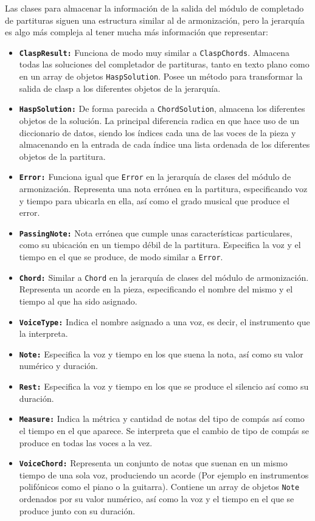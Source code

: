 Las clases para almacenar la información de la salida del módulo de completado de partituras siguen una estructura similar al de armonización, pero la jerarquía es algo más compleja al tener mucha más información que representar:
\begin{itemize}
	\item \texttt{\textbf{ClaspResult:}} Funciona de modo muy similar a \texttt{ClaspChords}. Almacena todas las soluciones del completador de partituras, tanto en texto plano como en un array de objetos \texttt{HaspSolution}. Posee un método para transformar la salida de clasp a los diferentes objetos de la jerarquía. 
	\item \texttt{\textbf{HaspSolution:}} De forma parecida a \texttt{ChordSolution}, almacena los diferentes objetos de la solución. La principal diferencia radica en que hace uso de un diccionario de datos, siendo los índices cada una de las voces de la pieza y almacenando en la entrada de cada índice una lista ordenada de los diferentes objetos de la partitura.
	\item \texttt{\textbf{Error:}} Funciona igual que \texttt{Error} en la jerarquía de clases del módulo de armonización. Representa una nota errónea en la partitura, especificando voz y tiempo para ubicarla en ella, así como el grado musical que produce el error.
	\item \texttt{\textbf{PassingNote:}} Nota errónea que cumple unas características particulares, como su ubicación en un tiempo débil de la partitura. Especifica la voz y el tiempo en el que se produce, de modo similar a \texttt{Error}.
	\item \texttt{\textbf{Chord:}} Similar a \texttt{Chord} en la jerarquía de clases del módulo de armonización. Representa un acorde en la pieza, especificando el nombre del mismo y el tiempo al que ha sido asignado.
	\item \texttt{\textbf{VoiceType:}} Indica el nombre asignado a una voz, es decir, el instrumento que la interpreta.
	\item \texttt{\textbf{Note:}} Especifica la voz y tiempo en los que suena la nota, así como su valor numérico y duración.
	\item \texttt{\textbf{Rest:}} Especifica la voz y tiempo en los que se produce el silencio así como su duración.
	\item \texttt{\textbf{Measure:}} Indica la métrica y cantidad de notas del tipo de compás así como el tiempo en el que aparece. Se interpreta que el cambio de tipo de compás se produce en todas las voces a la vez.
	\item \texttt{\textbf{VoiceChord:}} Representa un conjunto de notas que suenan en un mismo tiempo de una sola voz, produciendo un acorde (Por ejemplo en instrumentos polifónicos como el piano o la guitarra). Contiene un array de objetos \texttt{Note} ordenados por su valor numérico, así como la voz y el tiempo en el que se produce junto con su duración.
\end{itemize}


